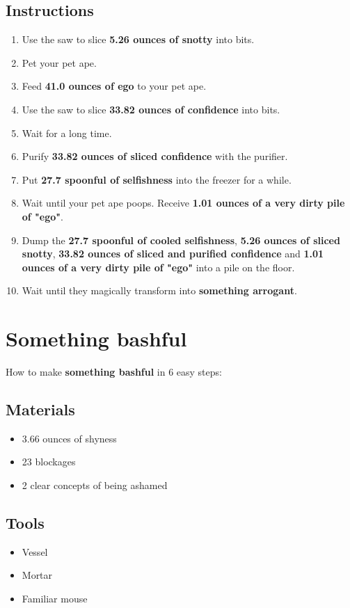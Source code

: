 \documentclass{article}
\begin{document}
\subsection{Instructions}\begin{enumerate}
\item 
Use the saw to slice \textbf{5.26 ounces of snotty} into bits.
\item 
Pet your pet ape.
\item 
Feed \textbf{41.0 ounces of ego} to your pet ape.
\item 
Use the saw to slice \textbf{33.82 ounces of confidence} into bits.
\item 
Wait for a long time.
\item 
Purify \textbf{33.82 ounces of sliced confidence} with the purifier.
\item 
Put \textbf{27.7 spoonful of selfishness} into the freezer for a while.
\item 
Wait until your pet ape poops. Receive \textbf{1.01 ounces of a very dirty pile of "ego"}.
\item 
Dump the \textbf{27.7 spoonful of cooled selfishness}, \textbf{5.26 ounces of sliced snotty}, \textbf{33.82 ounces of sliced and purified confidence} and \textbf{1.01 ounces of a very dirty pile of "ego"} into a pile on the floor.
\item 
Wait until they magically transform into \textbf{something arrogant}.
\end{enumerate}
\newpage
\section{Something bashful}How to make \textbf{something bashful} in 6 easy steps:

\subsection{Materials}\begin{itemize}
\item 
3.66 ounces of shyness
\item 
23 blockages
\item 
2 clear concepts of being ashamed
\end{itemize}
\subsection{Tools}\begin{itemize}
\item 
Vessel
\item 
Mortar
\item 
Familiar mouse
\end{itemize}
\end{document}
